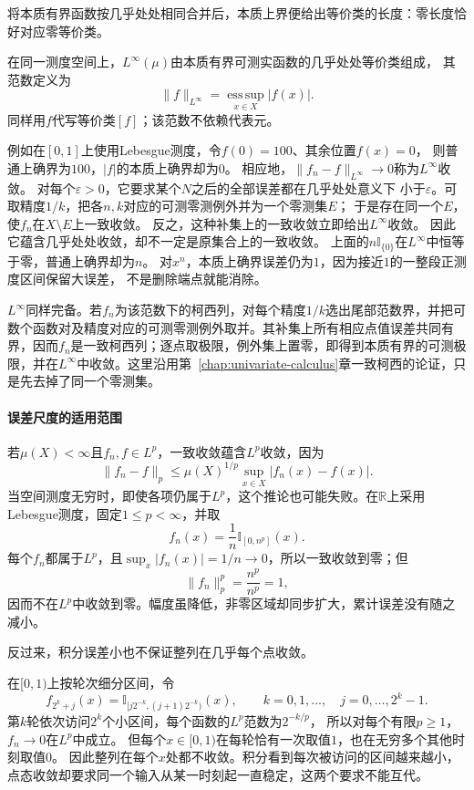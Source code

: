 将本质有界函数按几乎处处相同合并后，本质上界便给出等价类的长度：零长度恰好对应零等价类。
\begin{definition}
\label{def:analysis-linfty-space}
在同一测度空间上，$L^\infty(\mu)$由本质有界可测实函数的几乎处处等价类组成，
其范数定义为
\begin{equation}
  \lVert f\rVert_{L^\infty}
  =
  \operatorname*{ess\,sup}_{x\in X}|f(x)|.
\label{eq:analysis-essential-supremum-norm}
\end{equation}
同样用$f$代写等价类$[f]$；该范数不依赖代表元。
\end{definition}
例如在$[0,1]$上使用Lebesgue测度，令$f(0)=100$、其余位置$f(x)=0$，
则普通上确界为$100$，$|f|$的本质上确界却为$0$。
相应地，$\lVert f_n-f\rVert_{L^\infty}\to0$称为$L^\infty$收敛。
对每个$\varepsilon>0$，它要求某个$N$之后的全部误差都在几乎处处意义下
小于$\varepsilon$。可取精度$1/k$，把各$n,k$对应的可测零测例外并为一个零测集$E$；
于是存在同一个$E$，使$f_n$在$X\setminus E$上一致收敛。
反之，这种补集上的一致收敛立即给出$L^\infty$收敛。
因此它蕴含几乎处处收敛，却不一定是原集合上的一致收敛。
上面的$n\mathbb I_{\{0\}}$在$L^\infty$中恒等于零，普通上确界却为$n$。
对$x^n$，本质上确界误差仍为$1$，因为接近$1$的一整段正测度区间保留大误差，
不是删除端点就能消除。

$L^\infty$同样完备。若$f_n$为该范数下的柯西列，对每个精度$1/k$选出尾部范数界，并把可数个函数对及精度对应的可测零测例外取并。其补集上所有相应点值误差共同有界，因而$f_n$是一致柯西列；逐点取极限，例外集上置零，即得到本质有界的可测极限，并在$L^\infty$中收敛。这里沿用第~\ref{chap:univariate-calculus}章一致柯西的论证，只是先去掉了同一个零测集。

\paragraph{误差尺度的适用范围}

若$\mu(X)<\infty$且$f_n,f\in L^p$，一致收敛蕴含$L^p$收敛，因为
\[   \lVert f_n-f\rVert_p   \leq   \mu(X)^{1/p}\sup_{x\in X}|f_n(x)-f(x)|. \]
当空间测度无穷时，即使各项仍属于$L^p$，这个推论也可能失败。在$\mathbb R$上采用
Lebesgue测度，固定$1\leq p<\infty$，并取
\[
  f_n(x)=\frac1n\mathbb I_{[0,n^p]}(x).
\]
每个$f_n$都属于$L^p$，且$\sup_x|f_n(x)|=1/n\to0$，所以一致收敛到零；但
\[
  \lVert f_n\rVert_p^p=\frac{n^p}{n^p}=1,
\]
因而不在$L^p$中收敛到零。幅度虽降低，非零区域却同步扩大，累计误差没有随之减小。

反过来，积分误差小也不保证整列在几乎每个点收敛。
\begin{example}[小区间轮流扫过定义域]
\label{ex:analysis-lp-without-ae-limit}
在$[0,1)$上按轮次细分区间，令
\[
 f_{2^k+j}(x)=\mathbb I_{[j2^{-k},(j+1)2^{-k})}(x),
 \qquad k=0,1,\ldots,\quad j=0,\ldots,2^k-1.
\]
第$k$轮依次访问$2^k$个小区间，每个函数的$L^p$范数为$2^{-k/p}$，
所以对每个有限$p\geq1$，$f_n\to0$在$L^p$中成立。
但每个$x\in[0,1)$在每轮恰有一次取值$1$，也在无穷多个其他时刻取值$0$。
因此整列在每个$x$处都不收敛。积分看到每次被访问的区间越来越小，
点态收敛却要求同一个输入从某一时刻起一直稳定，这两个要求不能互代。
\end{example}


